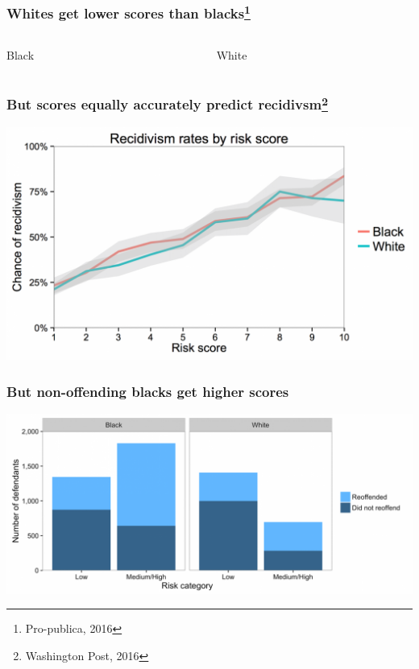 \begin{frame}
  \frametitle{Whites get lower scores than blacks\footnote{Pro-publica, 2016}}
  
  \begin{columns}
    \begin{column}{0.5\textwidth}
      \centering
      \def\svgwidth{\columnwidth}
      
      Black
    \end{column}
    \begin{column}{0.5\textwidth}
      \centering
      \def\svgwidth{\columnwidth}
            
      White
    \end{column}
  \end{columns}
\end{frame}

\begin{frame}
  \frametitle{But scores equally accurately predict recidivsm\footnote{Washington Post, 2016}}
  \centering
  \includegraphics[width=\columnwidth]{../figures/imrs}

\end{frame}
\begin{frame}
  \frametitle{But non-offending blacks get higher scores}
  \centering
  \includegraphics[width=\columnwidth]{../figures/imrs-risk}
\end{frame}

